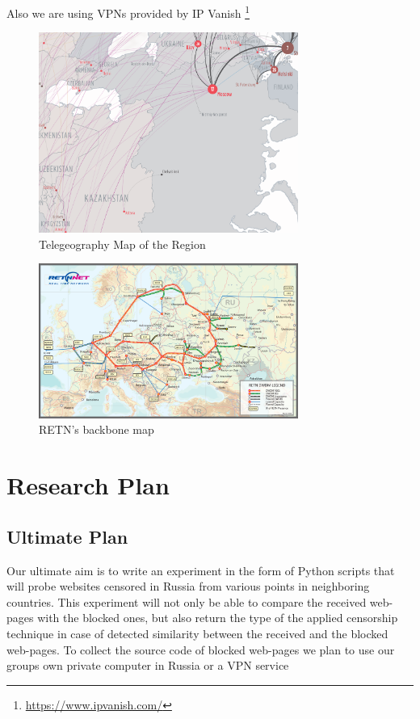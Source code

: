 \documentclass[conference]{IEEEtran}
\begin{document}
Also we are using VPNs provided by IP Vanish
\footnote{\url{https://www.ipvanish.com/}}

\begin{figure}[H]
\centering
\includegraphics[width=85mm]{routeMap.png}
\caption{Telegeography Map of the Region \label{teleG}}
\label{fig:fig3}
\end{figure}

\begin{figure}[H]
\centering
\includegraphics[width=85mm]{figure2.png}
\caption{RETN's backbone map \label{RetnMap}}
\label{fig:fig2}
\end{figure}


\section{Research Plan}
\subsection{Ultimate Plan}
Our ultimate aim is to write an experiment in the form of Python scripts that will probe websites censored in Russia from various points in neighboring countries. 
This experiment will not only be able to compare the received web-pages with the blocked ones, but also return the type of the applied censorship technique in case of detected similarity between the received and the blocked web-pages. 
To collect the source code of blocked web-pages we plan to use our groups own private computer in Russia or a VPN service
\end{document}
